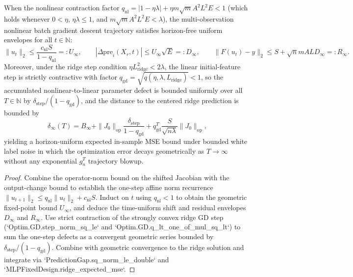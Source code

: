 \begin{lemma}\label{lem:mlp_contractive}
\leanok
{}
When the nonlinear contraction factor $q_{\mathrm{nl}} = |1-\eta\lambda| + \eta m\sqrt{m}A^2 L^2 E < 1$ (which holds whenever $0<\eta$, $\eta\lambda\le 1$, and $m\sqrt{m}A^2 L^2 E < \lambda$), the multi-observation nonlinear batch gradient descent trajectory satisfies horizon-free uniform envelopes for all $t\in\mathbb{N}$:
\[
\|u_t\|_2 \le \frac{c_{\mathrm{nl}} S}{1 - q_{\mathrm{nl}}} =: U_\infty,\qquad
|\Delta\mathrm{pre}_i(X_r,t)| \le U_\infty\sqrt{E} =: D_\infty,\qquad
\|F(u_t)-y\|_2 \le S + \sqrt{n}m A L D_\infty =: R_\infty.
\]
Moreover, under the ridge step condition $\eta L_{\mathrm{ridge}}^2 < 2\lambda$, the linear initial-feature step is strictly contractive with factor $q_{\mathrm{gd}} = \sqrt{q(\eta,\lambda,L_{\mathrm{ridge}})} < 1$, so the accumulated nonlinear-to-linear parameter defect is bounded uniformly over all $T\in\mathbb{N}$ by $\delta_{\mathrm{step}}/(1-q_{\mathrm{gd}})$, and the distance to the centered ridge prediction is bounded by
\[
\delta_\infty(T) = B_\infty + \|J_0\|_{\mathrm{op}}\frac{\delta_{\mathrm{step}}}{1-q_{\mathrm{gd}}} + q_{\mathrm{gd}}^T \frac{S}{\sqrt{n\lambda}}\|J_0\|_{\mathrm{op}},
\]
yielding a horizon-uniform expected in-sample MSE bound under bounded white label noise in which the optimization error decays geometrically as $T\to\infty$ without any exponential $g_n^T$ trajectory blowup.
\end{lemma}
\begin{proof}
\leanok
Combine the operator-norm bound on the shifted Jacobian with the output-change bound to establish the one-step affine norm recurrence $\|u_{t+1}\|_2 \le q_{\mathrm{nl}}\|u_t\|_2 + c_{\mathrm{nl}}S$. Induct on $t$ using $q_{\mathrm{nl}}<1$ to obtain the geometric fixed-point bound $U_\infty$, and deduce the time-uniform shift and residual envelopes $D_\infty$ and $R_\infty$. Use strict contraction of the strongly convex ridge GD step (`Optim.GD.step_norm_sq_le` and `Optim.GD.q_lt_one_of_mul_sq_lt`) to sum the one-step defects as a convergent geometric series bounded by $\delta_{\mathrm{step}}/(1-q_{\mathrm{gd}})$. Combine with geometric convergence to the ridge solution and integrate via `PredictionGap.sq_norm_le_double` and `MLPFixedDesign.ridge_expected_mse`.
\end{proof}

